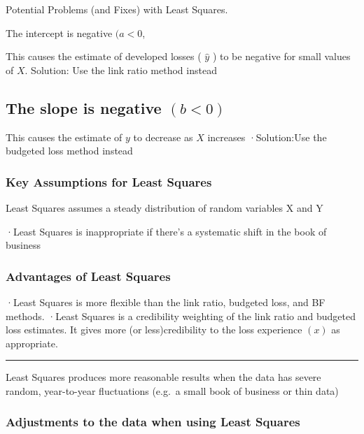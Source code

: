 \documentclass[
]{article}
\begin{document}
Potential Problems (and Fixes) with Least Squares.

The intercept is negative \((a<0\),

This causes the estimate of developed losses ( \(\hat{y}\) ) to be
negative for small values of \(X.\) Solution: Use the link ratio method
instead

\subsection{\texorpdfstring{The slope is negative
\((b<0)\)}{The slope is negative (b\textless0)}}\label{the-slope-is-negative-b0}

This causes the estimate of \(y\) to decrease as \(X\) increases
·Solution:Use the budgeted loss method instead

\subsubsection{Key Assumptions for Least
Squares}\label{key-assumptions-for-least-squares}

Least Squares assumes a steady distribution of random variables X and Y

·Least Squares is inappropriate if there's a systematic shift in the
book of business

\subsubsection{Advantages of Least
Squares}\label{advantages-of-least-squares}

·Least Squares is more flexible than the link ratio, budgeted loss, and
BF methods. ·Least Squares is a credibility weighting of the link ratio
and budgeted loss estimates. It gives more (or less)credibility to the
loss experience \((x)\) as appropriate.

\begin{center}\rule{0.5\linewidth}{0.5pt}\end{center}

Least Squares produces more reasonable results when the data has severe
random, year-to-year fluctuations (e.g.~a small book of business or thin
data)

\subsubsection{Adjustments to the data when using Least
Squares}\label{adjustments-to-the-data-when-using-least-squares}
\end{document}
